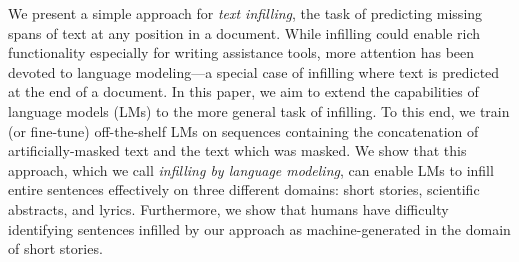 We present a simple approach for \emph{text infilling}, 
the task of predicting missing spans of text at any position in a document.
While infilling could enable rich functionality especially for writing assistance tools, 
more attention has been devoted to language modeling---a special case of infilling where text is predicted at the end of a document.
In this paper, we aim to extend the capabilities of language models (LMs) to the more general task of infilling. 
To this end, we train (or fine-tune) off-the-shelf LMs on sequences containing the concatenation of artificially-masked text and the text which was masked. 
We show that this approach,
which we call \emph{infilling by language modeling}, 
can enable LMs to infill entire sentences effectively on three different domains: short stories, scientific abstracts, and lyrics. 
Furthermore, 
we show that humans have difficulty identifying sentences infilled by our approach as machine-generated in the domain of short stories.
